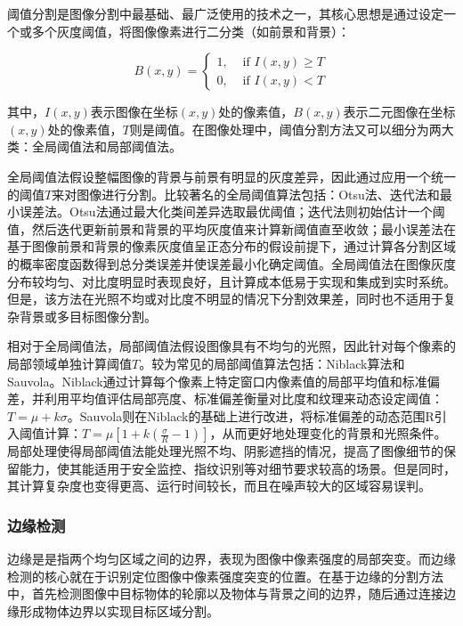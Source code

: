 阈值分割是图像分割中最基础、最广泛使用的技术之一，其核心思想是通过设定一个或多个灰度阈值，将图像像素进行二分类（如前景和背景）：

\begin{equation}
B(x, y)=\left\{\begin{array}{ll}1, & \text { if } I(x, y) \geq T \\ 0, & \text { if } I(x, y)<T\end{array}\right.
\end{equation}

其中，$I(x, y)$表示图像在坐标$(x, y)$处的像素值，$B(x, y)$表示二元图像在坐标$(x, y)$处的像素值，$T$则是阈值。在图像处理中，阈值分割方法又可以细分为两大类：全局阈值法和局部阈值法。

全局阈值法假设整幅图像的背景与前景有明显的灰度差异，因此通过应用一个统一的阈值$T$来对图像进行分割。比较著名的全局阈值算法包括：Otsu法、迭代法和最小误差法。Otsu法通过最大化类间差异选取最优阈值；迭代法则初始估计一个阈值，然后迭代更新前景和背景的平均灰度值来计算新阈值直至收敛；最小误差法在基于图像前景和背景的像素灰度值呈正态分布的假设前提下，通过计算各分割区域的概率密度函数得到总分类误差并使误差最小化确定阈值。全局阈值法在图像灰度分布较均匀、对比度明显时表现良好，且计算成本低易于实现和集成到实时系统。但是，该方法在光照不均或对比度不明显的情况下分割效果差，同时也不适用于复杂背景或多目标图像分割。

相对于全局阈值法，局部阈值法假设图像具有不均匀的光照，因此针对每个像素的局部领域单独计算阈值$T$。较为常见的局部阈值算法包括：Niblack算法和Sauvola。Niblack通过计算每个像素上特定窗口内像素值的局部平均值和标准偏差，并利用平均值评估局部亮度、标准偏差衡量对比度和纹理来动态设定阈值：$ T=\mu+k \sigma $。Sauvola则在Niblack的基础上进行改进，将标准偏差的动态范围R引入阈值计算：$ T=\mu\left[1+k\left(\frac{\sigma}{R}-1\right)\right] $，从而更好地处理变化的背景和光照条件。局部处理使得局部阈值法能处理光照不均、阴影遮挡的情况，提高了图像细节的保留能力，使其能适用于安全监控、指纹识别等对细节要求较高的场景。但是同时，其计算复杂度也变得更高、运行时间较长，而且在噪声较大的区域容易误判。

\subsubsection{边缘检测}


边缘是是指两个均匀区域之间的边界，表现为图像中像素强度的局部突变。而边缘检测的核心就在于识别定位图像中像素强度突变的位置。在基于边缘的分割方法中，首先检测图像中目标物体的轮廓以及物体与背景之间的边界，随后通过连接边缘形成物体边界以实现目标区域分割。

